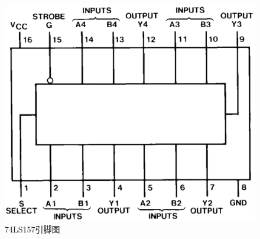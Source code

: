 \documentclass{article}
\begin{document}
\begin{figure}[H]
	\centering
	\includegraphics[width=.5\linewidth]{74LS157.png}
	\caption{74LS157引脚图}
	\label{fig:74LS157引脚图}
\end{figure}
\end{document}
